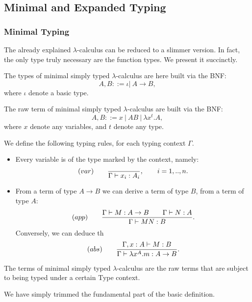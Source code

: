 \subsection{Minimal and Expanded Typing}
\subsubsection{Minimal Typing}
The already explained $\lambda$-calculus can be reduced to a slimmer version. In fact, the only type truly necessary are the function types. We present it succinctly.

\begin{definition}
  The types of minimal simply typed $\lambda$-calculus are here built via the BNF:
  $$A,B ::= \iota |\ A\to B,$$
  where $\iota$ denote a basic type. 
\end{definition}



\begin{definition}
  The raw term of minimal simply typed $\lambda$-calculus are built via the BNF:
  $$A,B ::= x\ |\ AB\ |\ \lambda x^t.A,$$
  where $x$ denote any variables, and $t$ denote any type. 
\end{definition}



\begin{definition}\label{def:typing-rules}
  We define the following typing rules, for each typing context $\Gamma$.
  \begin{itemize}
  \item Every variable is of the type marked by the context, namely:
    $$  (var)\qquad  {\displaystyle \over \Gamma \vdash x_i:A_i},\qquad  i=  1,..,n.$$

  \item From a term of type $A\to B$ we can derive a term of type $B$, from a term of type $A$:
    $$(app)\qquad  {\displaystyle \Gamma \vdash M:A\to B\qquad \Gamma \vdash N:A      \over \Gamma \vdash MN:B}.$$
    Conversely, we can deduce th
    $$(abs)\qquad  {\displaystyle \Gamma, x: A\vdash M: B  \over \Gamma \vdash \lambda x^A.m:A\to B}.$$
  \end{itemize}
\end{definition}

\begin{definition}
  The terms of minimal simply typed $\lambda$-calculus are the raw terms that are subject to being typed under a certain Type context.
\end{definition}
\begin{remark}
  We have simply trimmed the fundamental part of the basic definition.
\end{remark}
